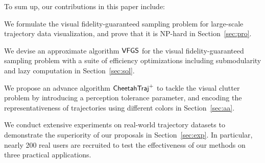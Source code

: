 
To sum up, our contributions in this paper include:
\squishlist
  \item We formulate the visual fidelity-guaranteed sampling problem for large-scale trajectory data visualization, and prove that it is {NP-hard} in Section~\ref{sec:pro}.
  \item We devise an approximate algorithm $\mathsf{VFGS}$ for the visual fidelity-guaranteed sampling problem with a suite of efficiency optimizations including submodularity and lazy computation in Section~\ref{sec:sol}.
  \item We propose an advance algorithm $\mathsf{CheetahTraj}^{+}$ to tackle the visual clutter problem by introducing a perception tolerance parameter, and encoding the representativeness of trajectories using different colors in Section~\ref{sec:aa}.
  \item We conduct extensive experiments on real-world trajectory datasets to demonstrate the superiority of our proposals in Section~\ref{sec:exp}. In particular, nearly 200 real users are recruited to test the effectiveness of our methods on three practical applications.
\squishend

